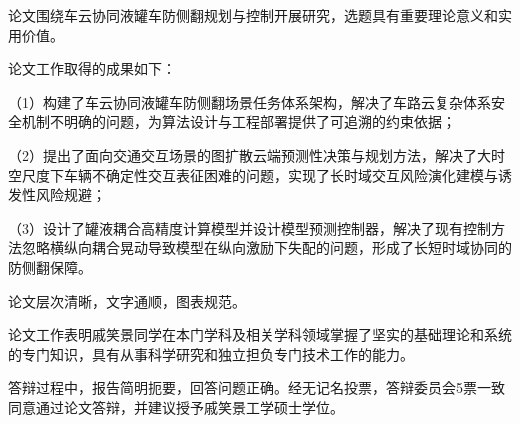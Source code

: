 
\begin{resolution}
论文围绕车云协同液罐车防侧翻规划与控制开展研究，选题具有重要理论意义和实用价值。

论文工作取得的成果如下：

（1）构建了车云协同液罐车防侧翻场景任务体系架构，解决了车路云复杂体系安全机制不明确的问题，为算法设计与工程部署提供了可追溯的约束依据；

（2）提出了面向交通交互场景的图扩散云端预测性决策与规划方法，解决了大时空尺度下车辆不确定性交互表征困难的问题，实现了长时域交互风险演化建模与诱发性风险规避；

（3）设计了罐液耦合高精度计算模型并设计模型预测控制器，解决了现有控制方法忽略横纵向耦合晃动导致模型在纵向激励下失配的问题，形成了长短时域协同的防侧翻保障。

论文层次清晰，文字通顺，图表规范。

论文工作表明戚笑景同学在本门学科及相关学科领域掌握了坚实的基础理论和系统的专门知识，具有从事科学研究和独立担负专门技术工作的能力。

答辩过程中，报告简明扼要，回答问题正确。经无记名投票，答辩委员会5票一致同意通过论文答辩，并建议授予戚笑景工学硕士学位。

\end{resolution}
